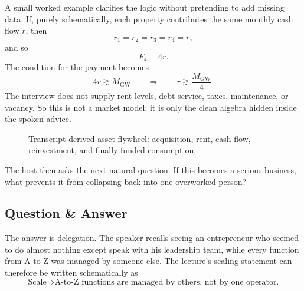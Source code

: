 A small worked example clarifies the logic without pretending to add missing data. If, purely schematically, each property contributes the same monthly cash flow \(r\), then
\[
r_1=r_2=r_3=r_4=r,
\]
and so
\begin{equation}
F_4=4r.
\end{equation}
The condition for the payment becomes
\begin{equation}
4r \gtrsim M_{\mathrm{GW}}
\qquad\Longrightarrow\qquad
r \gtrsim \frac{M_{\mathrm{GW}}}{4}.
\end{equation}
The interview does not supply rent levels, debt service, taxes, maintenance, or vacancy. So this is not a market model; it is only the clean algebra hidden inside the spoken advice.

\begin{figure}[h]
\centering
{}
\caption{Transcript-derived asset flywheel: acquisition, rent, cash flow, reinvestment, and finally funded consumption.}
\end{figure}

The host then asks the next natural question. If this becomes a serious business, what prevents it from collapsing back into one overworked person?

\subsection{Question \& Answer}

The answer is delegation. The speaker recalls seeing an entrepreneur who seemed to do almost nothing except speak with his leadership team, while every function from A to Z was managed by someone else. The lecture's scaling statement can therefore be written schematically as
\begin{equation}
\text{Scale} \Longrightarrow \text{A-to-Z functions are managed by others, not by one operator.}
\end{equation}

